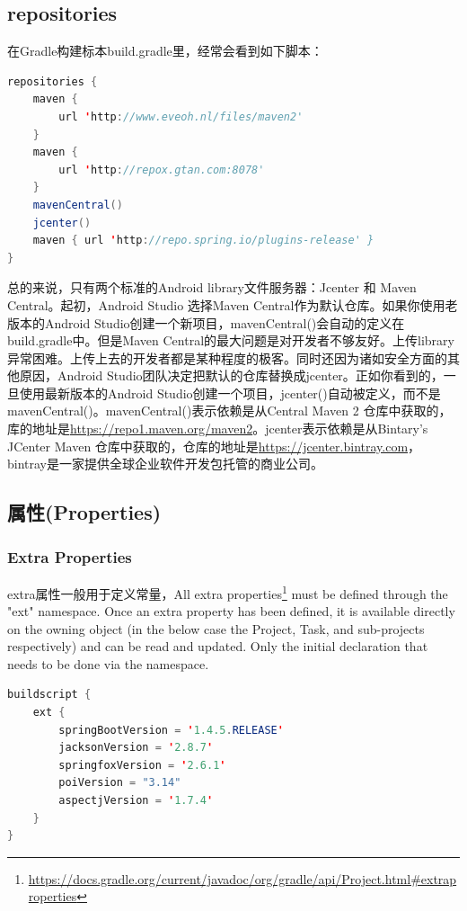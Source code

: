 \documentclass[letter]{book}
\begin{document}
\subsection{repositories}

在Gradle构建标本build.gradle里，经常会看到如下脚本：

\begin{lstlisting}[language=Java]
repositories {
	maven {
		url 'http://www.eveoh.nl/files/maven2'
	}
	maven {
		url 'http://repox.gtan.com:8078'
	}
	mavenCentral()
	jcenter()
	maven { url 'http://repo.spring.io/plugins-release' }
}
\end{lstlisting}

总的来说，只有两个标准的Android library文件服务器：Jcenter 和 Maven Central。起初，Android Studio 选择Maven Central作为默认仓库。如果你使用老版本的Android Studio创建一个新项目，mavenCentral()会自动的定义在build.gradle中。但是Maven Central的最大问题是对开发者不够友好。上传library异常困难。上传上去的开发者都是某种程度的极客。同时还因为诸如安全方面的其他原因，Android Studio团队决定把默认的仓库替换成jcenter。正如你看到的，一旦使用最新版本的Android Studio创建一个项目，jcenter()自动被定义，而不是mavenCentral()。mavenCentral()表示依赖是从Central Maven 2 仓库中获取的，库的地址是\url{https://repo1.maven.org/maven2}。jcenter表示依赖是从Bintary’s JCenter Maven 仓库中获取的，仓库的地址是\url{https://jcenter.bintray.com}，bintray是一家提供全球企业软件开发包托管的商业公司。

\subsection{属性(Properties)}

\subsubsection{Extra Properties}

extra属性一般用于定义常量，All extra properties\footnote{\url{https://docs.gradle.org/current/javadoc/org/gradle/api/Project.html\#extraproperties}} must be defined through the "ext" namespace. Once an extra property has been defined, it is available directly on the owning object (in the below case the Project, Task, and sub-projects respectively) and can be read and updated. Only the initial declaration that needs to be done via the namespace.

\begin{lstlisting}[language=Java]
buildscript {
	ext {
		springBootVersion = '1.4.5.RELEASE'
		jacksonVersion = '2.8.7'
		springfoxVersion = '2.6.1'
		poiVersion = "3.14"
		aspectjVersion = '1.7.4'
	}
}
\end{lstlisting}
\end{document}
